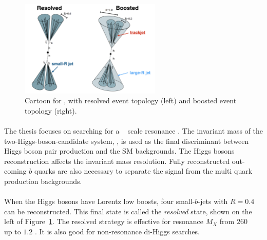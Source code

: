 \begin{figure}[h!]
  \centering
  \includegraphics[width=0.6\textwidth]{figures/theory/resolved_boosted}
  \caption{Cartoon for \Xtohhb, with resolved event topology (left) and boosted event topology (right).}
  \label{fig:resolved_bosted}
\end{figure}

\paragraph{}
The thesis focuses on searching for a \TeV~ scale resonance \Xtohhb. 
The invariant mass of the two-Higgs-boson-candidate system, \mtwoJ, is used as the final discriminant between Higgs boson pair production and the SM backgrounds.
The Higgs bosons reconstruction affects the \mtwoJ invariant mass resolution.
Fully reconstructed out-coming $b$ quarks are also necessary to separate the signal from the multi quark production backgrounds.

\paragraph{}
When the Higgs bosons have Lorentz low boosts, four small-\R $b$-jets with $R=0.4$ can be reconstructed.
This final state is called the \textit{resolved} state, shown on the left of Figure~\ref{fig:resolved_bosted}.
The resolved strategy is effective for resonance $M_X$ from $260$ \GeV~ up to $1.2$ \TeV.
It is also good for non-resonance di-Higgs searches.

